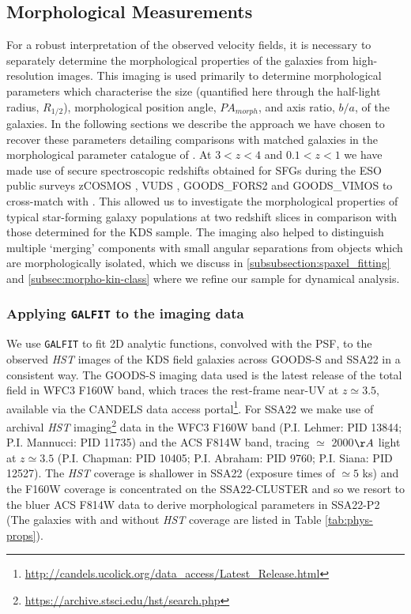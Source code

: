 \documentclass[fleqn,usenatbib]{mn2e}
\begin{document}
\subsection{Morphological Measurements}\label{subsec:morphological_measurements}
For a robust interpretation of the observed velocity fields, it is necessary to separately determine the morphological properties of the galaxies from high-resolution images.
This imaging is used primarily to determine morphological parameters which characterise the size (quantified here through the half-light radius, $R_{1/2}$), morphological position angle, $PA_{morph}$, and axis ratio, $b/a$, of the galaxies. 
In the following sections we describe the approach we have chosen to recover these parameters detailing comparisons with matched galaxies in the morphological parameter catalogue of \cite{VanderWel2012}.
At $3 < z < 4$ and $0.1 < z < 1$ we have made use of secure spectroscopic redshifts obtained for SFGs during the ESO public surveys zCOSMOS \citep{Lilly2007}, VUDS \citep{Tasca2016}, GOODS\_FORS2 \citep{Vanzella2005,Vanzella2006,Vanzella2008} and GOODS\_VIMOS \citep{Balestra2010} to cross-match with \cite{VanderWel2012}.
This allowed us to investigate the morphological properties of typical star-forming galaxy populations at two redshift slices in comparison with those determined for the KDS sample.
The imaging also helped to distinguish multiple `merging' components with small angular separations from objects which are morphologically isolated, which we discuss in \cref{subsubsection:spaxel_fitting} and \cref{subsec:morpho-kin-class} where we refine our sample for dynamical analysis.

\subsubsection{Applying {\tt GALFIT} to the imaging data}\label{subsubsec:galfitting}
We use {\tt GALFIT} \citep{Peng2010_galfit} to fit 2D analytic functions, convolved with the PSF, to the observed {\em HST} images of the KDS field galaxies across GOODS-S and SSA22 in a consistent way.
The GOODS-S imaging data used is the latest release of the total field in WFC3 F160W band, which traces the rest-frame near-UV at $z\simeq3.5$, available via the CANDELS \citep{Grogin2011,Koekemoer2011} data access portal\footnote{\url{http://candels.ucolick.org/data_access/Latest_Release.html}}.
For SSA22 we make use of archival {\em HST} imaging\footnote{\url{https://archive.stsci.edu/hst/search.php}} data in the WFC3 F160W band (P.I. Lehmer: PID 13844; P.I. Mannucci: PID 11735) and the ACS F814W band, tracing $\simeq$ 2000$\AA$ light at $z\simeq3.5$ (P.I. Chapman: PID 10405; P.I. Abraham: PID 9760; P.I. Siana: PID 12527).
The {\em HST} coverage is shallower in SSA22 (exposure times of $\simeq5$ ks) and the F160W coverage is concentrated on the SSA22-CLUSTER and so we resort to the bluer ACS F814W data to derive morphological parameters in SSA22-P2 (The galaxies with and without {\em HST} coverage are listed in Table \ref{tab:phys-props}). \\
\end{document}
